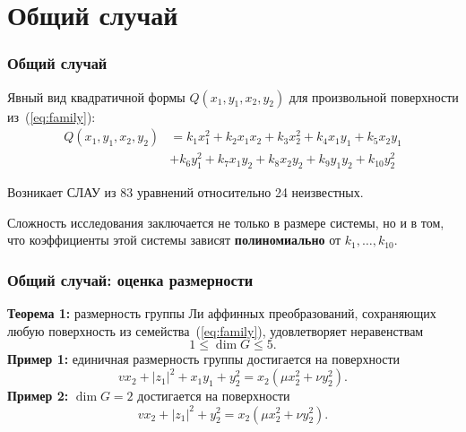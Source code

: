 \documentclass[russian,hyperref={unicode}]{beamer}
\begin{document}
\section{Общий случай}
\frame
{
	\frametitle{Общий случай}
	Явный вид квадратичной формы $Q(x_1, y_1, x_2, y_2)$ для произвольной поверхности из~(\ref{eq:family}): 
	\begin{align*}
	Q(x_1, y_1, x_2, y_2) &= k_1 x_1^2 + k_2 x_1 x_2 + k_3 x_2^2 + k_4 x_1 y_1 + k_5 x_2 y_1 \nonumber\\&+ k_6 y_1^2 + k_7 x_1 y_2 + k_8 x_2 y_2 + k_9 y_1 y_2 + k_{10} y_2^2
	\end{align*}
	
	Возникает СЛАУ из 83 уравнений относительно 24 неизвестных.
	
	Сложность исследования заключается не только в размере системы, но и в том, что 
	коэффициенты этой системы зависят \textbf{полиномиально} от $k_1, \dots, 
	k_{10}$.
}
\frame
{
	\frametitle{Общий случай: оценка размерности}
	\textbf{Теорема 1:}
	размерность группы Ли аффинных преобразований, сохраняющих 	любую поверхность 
	из семейства~(\ref{eq:family}), удовлетворяет неравенствам 
	$$
		1 \le \dim G \le 5.
	$$
	\textbf{Пример 1:}
	единичная размерность группы достигается на поверхности
	$$
		v x_2 + |z_1|^2 +x_1 y_1 + y_2^2 = x_2 (\mu x_2^2 + \nu y_2^2).
	$$ 
	\textbf{Пример 2:}
	$\dim G = 2$ достигается на поверхности
	$$
		v x_2 + |z_1|^2 + y_2^2 = x_2 (\mu x_2^2 + \nu y_2^2).
	$$ 
}
\end{document}
